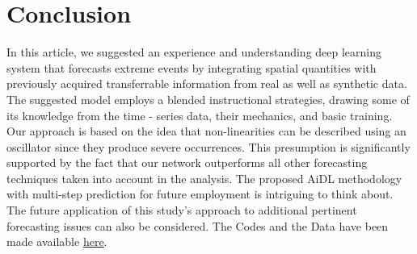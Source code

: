 \documentclass[conference]{IEEEtran}
\begin{document}
\section{Conclusion}\label{sec5}
In this article, we suggested an experience and understanding deep learning system that forecasts extreme events by integrating spatial quantities with previously acquired transferrable information from real as well as synthetic data.
The suggested model employs a blended instructional strategies, drawing some of its knowledge from the time - series data, their mechanics, and basic training. Our approach is based on the idea that non-linearities can be described using an oscillator since they produce severe occurrences. This presumption is significantly supported by the fact that our network outperforms all other forecasting techniques taken into account in the analysis. The proposed AiDL methodology with multi-step prediction for future employment is intriguing to think about. The future application of this study's approach to additional pertinent forecasting issues can also be considered. The Codes and the Data have been made available \href{https://colab.research.google.com/drive/1MRMVW7KC5zrH6ov2HMd-2UB9lwcoDdP8}{here}. 
\end{document}

